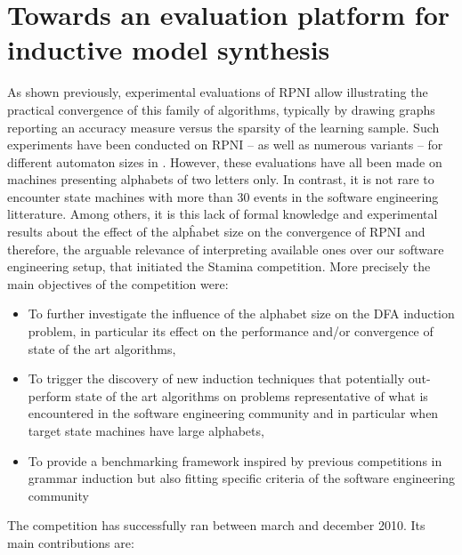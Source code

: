 \chapter{Towards an evaluation platform for inductive model synthesis\label{chapter:stamina}}

As shown previously, experimental evaluations of RPNI allow illustrating the practical convergence of this family of algorithms, typically by drawing graphs reporting an accuracy measure versus the sparsity of the learning sample. Such experiments have been conducted on RPNI -- as well as numerous variants -- for different automaton sizes in \cite{Lang98,Damas06,Dupont08,Lambeau08}. However, these evaluations have all been made on machines presenting alphabets of two letters only. In contrast, it is not rare to encounter state machines with more than 30 events in the software engineering litterature. Among others, it is this lack of formal knowledge and experimental results about the effect of the alpĥabet size on the convergence of RPNI and therefore, the arguable relevance of interpreting available ones over our software engineering setup, that initiated the Stamina competition. More precisely the main objectives of the competition were:

\begin{itemize}
\item To further investigate the influence of the alphabet size on the DFA induction problem, in particular its effect on the performance and/or convergence of state of the art algorithms,
\item To trigger the discovery of new induction techniques that potentially out-perform state of the art algorithms on problems representative of what is encountered in the software engineering community and in particular when target state machines have large alphabets,
\item To provide a benchmarking framework inspired by previous competitions in grammar induction but also fitting specific criteria of the software engineering community
\end{itemize}

The competition has successfully ran between march and december 2010. Its main contributions are:

